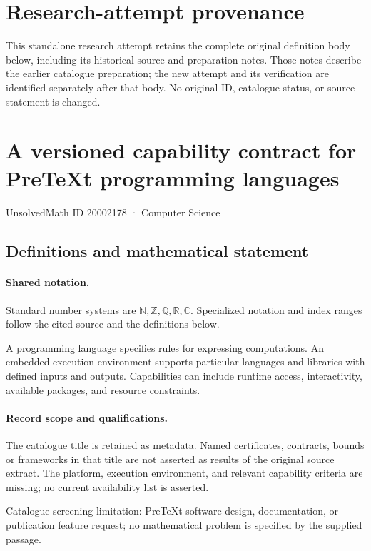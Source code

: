\documentclass[11pt]{article}
\begin{document}
\section*{Research-attempt provenance}
This standalone research attempt retains the complete original definition body below,
including its historical source and preparation notes. Those notes describe the
earlier catalogue preparation; the new attempt and its verification are identified
separately after that body. No original ID, catalogue status, or source statement is changed.

\section{A versioned capability contract for PreTeXt programming languages}\label{20002178}
{\small UnsolvedMath ID 20002178 · Computer Science}
\subsection{Definitions and mathematical statement}

\paragraph{Shared notation.}Standard number systems are $\mathbb N,\mathbb Z,\mathbb Q,\mathbb R,\mathbb C$. Specialized notation and index ranges follow the cited source and the definitions below.


A programming language specifies rules for expressing computations. An embedded execution environment supports particular languages and libraries with defined inputs and outputs. Capabilities can include runtime access, interactivity, available packages, and resource constraints.
\paragraph{Record scope and qualifications.}
The catalogue title is retained as metadata. Named certificates, contracts, bounds or frameworks in that title are not asserted as results of the original source extract.
The platform, execution environment, and relevant capability criteria are missing; no current availability list is asserted.

Catalogue screening limitation: PreTeXt software design, documentation, or publication feature request; no mathematical problem is specified by the supplied passage.
\end{document}
